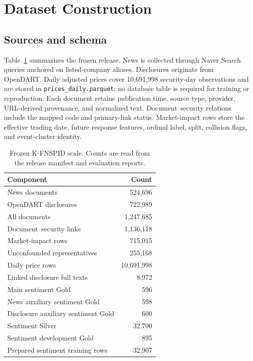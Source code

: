 \documentclass[11pt]{article}
\newcommand{\dataset}{K-FNSPID}
\begin{document}
\section{Dataset Construction}

\subsection{Sources and schema}

Table~\ref{tab:scale} summarizes the frozen release. News is collected through Naver Search queries anchored on listed-company aliases. Disclosures originate from OpenDART. Daily adjusted prices cover 10,691,998 security-day observations and are stored in \texttt{prices\_daily.parquet}; no database table is required for training or reproduction. Each document retains publication time, source type, provider, URL-derived provenance, and normalized text. Document--security relations include the mapped code and primary-link status. Market-impact rows store the effective trading date, future response features, ordinal label, split, collision flags, and event-cluster identity.

\begin{table}[t]
\centering
\small
\begin{tabular}{lr}
\toprule
Component & Count \\
\midrule
News documents & 524,696 \\
OpenDART disclosures & 722,989 \\
All documents & 1,247,685 \\
Document--security links & 1,136,118 \\
Market-impact rows & 715,015 \\
Unconfounded representatives & 255,168 \\
Daily price rows & 10,691,998 \\
Linked disclosure full texts & 8,972 \\
Main sentiment Gold & 596 \\
News auxiliary sentiment Gold & 598 \\
Disclosure auxiliary sentiment Gold & 600 \\
Sentiment Silver & 32,700 \\
Sentiment development Gold & 895 \\
Prepared sentiment training rows & 32,907 \\
\bottomrule
\end{tabular}
\caption{Frozen \dataset{} scale. Counts are read from the release manifest and evaluation reports.}
\label{tab:scale}
\end{table}
\end{document}
